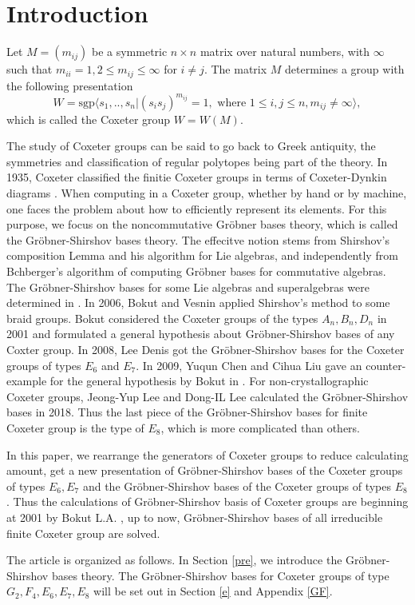 \documentclass[UTF8]{amsart}
\theoremstyle{definition}
\theoremstyle{remark}
\numberwithin{equation}{section}
\begin{document}
\section{Introduction}
Let $M=(m_{ij})$ be a symmetric $n\times n$ matrix over natural numbers, with $\infty$ such that $m_{ii}=1,2\leq m_{ij}\leq \infty $ for $i\ne j$. The matrix $M$ determines a group with the following presentation
$$
W=\mbox{sgp}\langle s_1,..,s_n|(s_is_j)^{m_{ij}}=1, \mbox{ where } 1\leq i,j\leq n, m_{ij}\ne \infty\rangle,
$$
which is called the Coxeter group $W=W(M)$.\par
The study of Coxeter groups can be said to go back to Greek antiquity, the symmetries and classification of regular polytopes being part of the theory. In 1935, Coxeter classified the finitie Coxeter groups in terms of Coxeter-Dynkin diagrams \cite{coxeter}. When computing in a Coxeter group, whether by hand or by machine, one faces the problem about how to efficiently represent its elements. For this purpose, we focus on  the  noncommutative Gr\"{o}bner bases theory, which is called the Gr\"{o}bner-Shirshov bases theory. The effecitve notion stems from Shirshov's composition Lemma and his algorithm \cite{MR2547481,MR0183753} for Lie algebras, and independently from Bchberger's algorithm \cite{MR2202562} of computing Gr\"{o}bner bases for commutative algebras. The Gr\"{o}bner-Shirshov bases  for some Lie algebras and superalgebras were determined in \cite{MR3899218,MR1800688,MR2028080,MR1700511,MR1414346,MR1733166,MR1432728}.  In 2006, Bokut and Vesnin \cite{MR2202556} applied Shirshov's method to some braid groups. Bokut considered the Coxeter groups of the types $A_n,B_n,D_n$ in 2001 \cite{MR1857281} and formulated a general hypothesis about Gr\"{o}bner-Shirshov bases of any Coxter group. In 2008, Lee Denis \cite{MR2440119} got the Gr\"{o}bner-Shirshov bases for the Coxeter groups of types $E_6$ and $E_7$.  In 2009, Yuqun Chen and Cihua Liu \cite{chen2009grbnershirshov} gave an counter-example for the general hypothesis by Bokut in \cite{MR1857281}. For non-crystallographic Coxeter groups, Jeong-Yup Lee and Dong-IL Lee \cite{MR3947551} calculated the Gr\"{o}bner-Shirshov bases in 2018. Thus the last piece of the Gr\"{o}bner-Shirshov bases for finite Coxeter group is the type of $E_8$,  which is more complicated than others.\par
In this paper, we rearrange the  generators of Coxeter groups to reduce calculating amount, get a new presentation of Gr\"{o}bner-Shirshov bases of the Coxeter groups of types $E_6,E_7$ and the Gr\"{o}bner-Shirshov bases of the Coxeter groups of types $E_8$. Thus the calculations of Gr\"{o}bner-Shirshov basis of Coxeter groups are beginning at 2001 by Bokut L.A. \cite{MR1857281}, up to now, Gr\"{o}bner-Shirshov bases of all  irreducible finite Coxeter group are solved. \par
The article is organized as follows. In Section \ref{pre}, we introduce the Gr\"{o}bner-Shirshov bases theory. The Gr\"{o}bner-Shirshov bases  for Coxeter groups of type $G_2,F_4,E_6,E_7,E_8$ will be set out in  Section \ref{e} and Appendix \ref{GF}.
\end{document}
